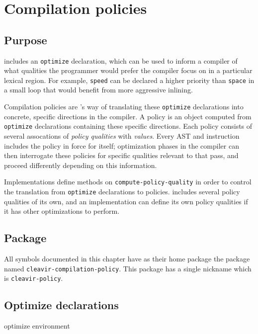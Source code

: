 \chapter{Compilation policies}
\label{chap-policy}

\section{Purpose}

\commonlisp{} includes an \texttt{optimize} declaration, which can
be used to inform a compiler of what qualities the programmer would
prefer the compiler focus on in a particular lexical region. For
example, \texttt{speed} can be declared a higher priority than
\texttt{space} in a small loop that would benefit from more
aggressive inlining.

Compilation policies are \sysname{}'s way of translating these
\texttt{optimize} declarations into concrete, specific directions in
the compiler. A policy is an object computed from \texttt{optimize}
declarations containing these specific directions. Each policy
consists of several assocations of \textit{policy qualities} with
\textit{values}. Every AST and instruction includes the policy in
force for itself; optimization phases in the compiler can then
interrogate these policies for specific qualities relevant to that
pass, and proceed differently depending on this information.

Implementations define methods on \texttt{compute-policy-quality} in
order to control the translation from \texttt{optimize} declarations
to policies. \sysname{} includes several policy qualities of its own,
and an implementation can define its own policy qualities if it has
other optimizations to perform.

\section{Package}

All symbols documented in this chapter have as their home package
the package named \texttt{cleavir-compilation-policy}. This package
has a single nickname which is \texttt{cleavir-policy}.

\section{Optimize declarations}

 {optimize environment}

